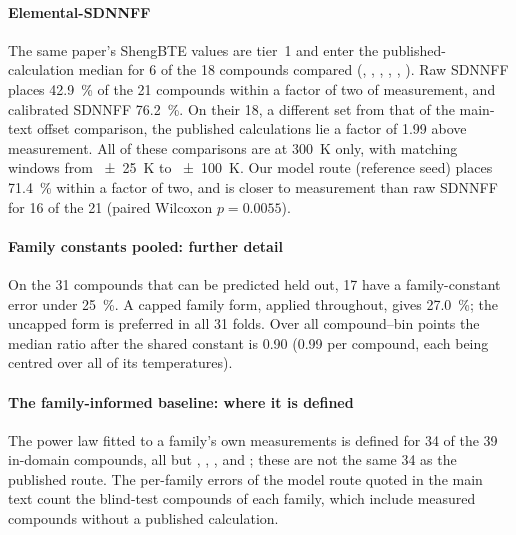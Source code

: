 \documentclass[preprint, 12pt]{elsarticle}
\begin{document}
\paragraph{Elemental-SDNNFF} The same paper's ShengBTE values are tier~1 and enter the
published-calculation median for \num{6} of the \num{18} compounds compared (,
, , , , ). Raw SDNNFF places
\SI{42.9}{\percent} of the \num{21} compounds within a factor of two of measurement, and calibrated
SDNNFF \SI{76.2}{\percent}. On their \num{18}, a different set from that of the main-text offset
comparison, the published calculations lie a factor of \num{1.99} above measurement. All of these
comparisons are at \SI{300}{\kelvin} only, with matching windows from \SI{\pm 25}{\kelvin} to
\SI{\pm 100}{\kelvin}. Our model route (reference seed) places \SI{71.4}{\percent} within a factor
of two, and is closer to measurement than raw SDNNFF for \num{16} of the \num{21} (paired Wilcoxon
$p=\num{0.0055}$).

\paragraph{Family constants pooled: further detail} On the \num{31} compounds that can be predicted
held out, \num{17} have a family-constant error under \SI{25}{\percent}. A capped family form,
applied throughout, gives \SI{27.0}{\percent}; the uncapped form is preferred in all \num{31}
folds. Over all compound--bin points the median ratio after the shared constant is \num{0.90}
(\num{0.99} per compound, each being centred over all of its temperatures).

\paragraph{The family-informed baseline: where it is defined} The power law fitted to a family's
own measurements is defined for \num{34} of the \num{39} in-domain compounds, all but ,
, ,  and ; these are not the same \num{34} as the
published route. The per-family errors of the model route quoted in the main text count the
blind-test compounds of each family, which include measured compounds without a published
calculation.
\end{document}
